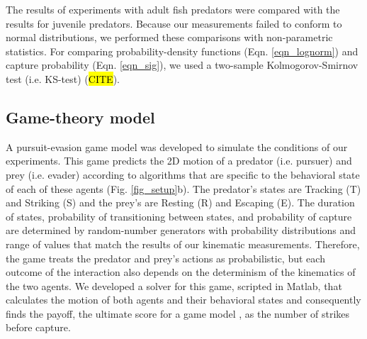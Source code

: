 \documentclass[]{rsos}%
\begin{document}
The results of experiments with adult fish predators were compared with the results for juvenile predators.
Because our measurements failed to conform to normal distributions, we performed these comparisons with non-parametric statistics. 
For comparing probability-density functions (Eqn. \ref{eqn_lognorm}) and capture probability (Eqn. \ref{eqn_sig}), we used a two-sample Kolmogorov-Smirnov test (i.e. KS-test) (\hl{CITE}). 


\subsection{Game-theory model}

A pursuit-evasion game model was developed to simulate the conditions of our experiments. 
This game predicts the 2D motion of a predator (i.e. pursuer) and prey (i.e. evader) according to algorithms that are specific to the behavioral state of each of these agents (Fig. \ref{fig_setup}b). 
The predator's states are Tracking (T) and Striking (S) and the prey's are Resting (R) and Escaping (E). 
The duration of states, probability of transitioning between states, and probability of capture are determined by random-number generators with probability distributions and range of values that match the results of our kinematic measurements.
Therefore, the game treats the predator and prey's actions as probabilistic, but each outcome of the interaction also depends on the determinism of the kinematics of the two agents.
We developed a solver for this game, scripted in Matlab, that calculates the motion of both agents and their behavioral states and consequently finds the payoff, the ultimate score for a game model \cite{Isaacs:1965uz}, as the number of strikes before capture.
\end{document}
